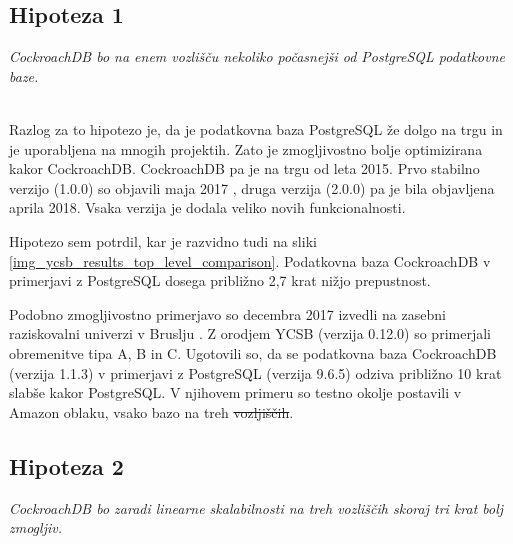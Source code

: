\documentclass[a4paper, 12pt]{book}
\providecommand{\DIFaddtex}[1]{{\protect\color{blue}\uwave{#1}}} %
\providecommand{\DIFdeltex}[1]{{\protect\color{red}\sout{#1}}}                      %
\providecommand{\DIFaddbegin}{} %
\providecommand{\DIFaddend}{} %
\providecommand{\DIFdelbegin}{} %
\providecommand{\DIFdelend}{} %
\providecommand{\DIFadd}[1]{\texorpdfstring{\DIFaddtex{#1}}{#1}} %
\providecommand{\DIFdel}[1]{\texorpdfstring{\DIFdeltex{#1}}{}} %
\newcommand{\DIFscaledelfig}{0.5}
\newlength{\DIFdelgraphicswidth} %
\newlength{\DIFdelgraphicsheight} %
\newcommand{\DIFaddincludegraphics}[2][]{{\color{blue}\fbox{\DIFOincludegraphics[#1]{#2}}}} %
\newcommand{\DIFdelincludegraphics}[2][]{%
\sbox{\DIFdelgraphicsbox}{\DIFOincludegraphics[#1]{#2}}%
\settoboxwidth{\DIFdelgraphicswidth}{\DIFdelgraphicsbox} %
\settoboxtotalheight{\DIFdelgraphicsheight}{\DIFdelgraphicsbox} %
\scalebox{\DIFscaledelfig}{%
\parbox[b]{\DIFdelgraphicswidth}{\usebox{\DIFdelgraphicsbox}\\[-\baselineskip] \rule{\DIFdelgraphicswidth}{0em}}\llap{\resizebox{\DIFdelgraphicswidth}{\DIFdelgraphicsheight}{%
\setlength{\unitlength}{\DIFdelgraphicswidth}%
\begin{picture}(1,1)%
\thicklines\linethickness{2pt} %
{\color[rgb]{1,0,0}\put(0,0){\framebox(1,1){}}}%
{\color[rgb]{1,0,0}\put(0,0){\line( 1,1){1}}}%
{\color[rgb]{1,0,0}\put(0,1){\line(1,-1){1}}}%
\end{picture}%
}\hspace*{3pt}}} %
} %
\DeclareRobustCommand{\DIFaddbegin}{\DIFOaddbegin \let\includegraphics\DIFaddincludegraphics} %
\DeclareRobustCommand{\DIFaddend}{\DIFOaddend \let\includegraphics\DIFOincludegraphics} %
\DeclareRobustCommand{\DIFdelbegin}{\DIFOdelbegin \let\includegraphics\DIFdelincludegraphics} %
\DeclareRobustCommand{\DIFdelend}{\DIFOaddend \let\includegraphics\DIFOincludegraphics} %
\begin{document}
\DIFdelbegin %

\DIFdelend \subsection{Hipoteza 1}
\textit{CockroachDB bo na enem vozlišču nekoliko počasnejši od PostgreSQL podatkovne baze.}

\ \\
Razlog za to hipotezo je, da je podatkovna baza PostgreSQL že dolgo na trgu \cite{Postgres-first-release} in je uporabljena na mnogih projektih. Zato je zmogljivostno bolje optimizirana kakor CockroachDB. CockroachDB pa je na trgu od leta 2015. Prvo stabilno verzijo (1.0.0) so objavili maja 2017 \cite{CRDB-2017}, druga verzija (2.0.0) pa je bila objavljena aprila 2018. Vsaka verzija je dodala veliko novih funkcionalnosti.


Hipotezo sem potrdil, kar je razvidno tudi na sliki \ref{img_ycsb_results_top_level_comparison}. Podatkovna baza CockroachDB v primerjavi z PostgreSQL dosega približno 2,7 krat nižjo prepustnost.

Podobno zmogljivostno primerjavo so decembra 2017 izvedli na zasebni raziskovalni univerzi v Bruslju \cite{CRDB-2017}. Z orodjem YCSB (verzija 0.12.0) so primerjali obremenitve tipa A, B in C. Ugotovili so, da se podatkovna baza CockroachDB (verzija 1.1.3) v primerjavi z PostgreSQL (verzija 9.6.5) odziva približno 10 krat slabše kakor PostgreSQL. V njihovem primeru so testno okolje postavili v Amazon oblaku, vsako bazo na treh \DIFdelbegin \DIFdel{vozljiščih}\DIFdelend \DIFaddbegin \DIFadd{vozliščih}\DIFaddend .

\subsection{Hipoteza 2}
\textit{CockroachDB bo zaradi linearne skalabilnosti na treh vozliščih skoraj tri krat bolj zmogljiv.}
\end{document}
